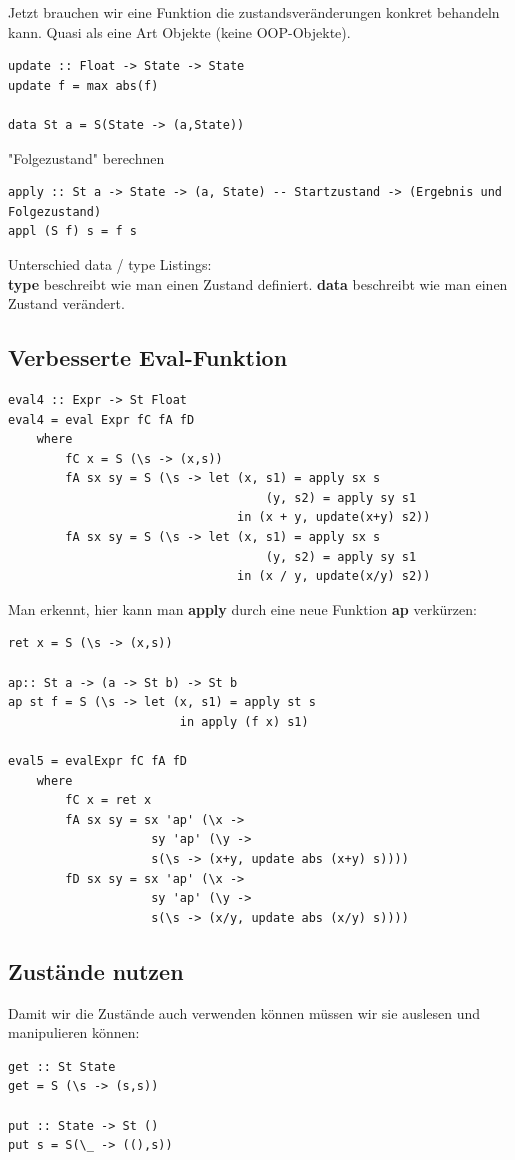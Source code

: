 \documentclass[ngerman,a4paper]{report}
\begin{document}
Jetzt brauchen wir eine Funktion die zustandsveränderungen konkret behandeln kann. Quasi als eine Art Objekte (keine OOP-Objekte).
\begin{lstlisting}
update :: Float -> State -> State
update f = max abs(f)

data St a = S(State -> (a,State))
\end{lstlisting}

"Folgezustand" berechnen

\begin{lstlisting}
apply :: St a -> State -> (a, State) -- Startzustand -> (Ergebnis und Folgezustand)
appl (S f) s = f s
\end{lstlisting}

Unterschied data / type Listings:\\
\textbf{type} beschreibt wie man einen Zustand definiert.
\textbf{data} beschreibt wie man einen Zustand verändert.

\subsection{Verbesserte Eval-Funktion}
\begin{lstlisting}
eval4 :: Expr -> St Float
eval4 = eval Expr fC fA fD
	where
		fC x = S (\s -> (x,s))
		fA sx sy = S (\s -> let (x, s1) = apply sx s
									(y, s2) = apply sy s1
								in (x + y, update(x+y) s2))
		fA sx sy = S (\s -> let (x, s1) = apply sx s
									(y, s2) = apply sy s1
								in (x / y, update(x/y) s2))
\end{lstlisting}
Man erkennt, hier kann man \textbf{apply} durch eine neue Funktion \textbf{ap} verkürzen:
\begin{lstlisting}
ret x = S (\s -> (x,s))

ap:: St a -> (a -> St b) -> St b
ap st f = S (\s -> let (x, s1) = apply st s
						in apply (f x) s1)

eval5 = evalExpr fC fA fD
	where
		fC x = ret x
		fA sx sy = sx 'ap' (\x ->
					sy 'ap' (\y ->
					s(\s -> (x+y, update abs (x+y) s))))
		fD sx sy = sx 'ap' (\x ->
					sy 'ap' (\y ->
					s(\s -> (x/y, update abs (x/y) s))))
\end{lstlisting}

\subsection{Zustände nutzen}
Damit wir die Zustände auch verwenden können müssen wir sie auslesen und manipulieren können:
\begin{lstlisting}
get :: St State
get = S (\s -> (s,s))

put :: State -> St ()
put s = S(\_ -> ((),s))
\end{lstlisting}
\end{document}
